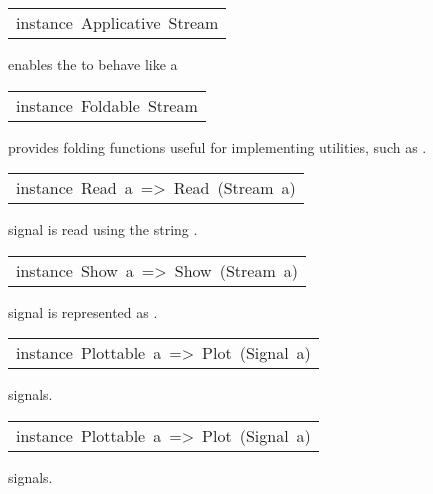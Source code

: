 \begin{haddockdesc}
\item[\begin{tabular}{@{}l}
instance\ Applicative\ Stream
\end{tabular}]\haddockbegindoc
enables the  to behave like a \par

\end{haddockdesc}
\begin{haddockdesc}
\item[\begin{tabular}{@{}l}
instance\ Foldable\ Stream
\end{tabular}]\haddockbegindoc
provides folding functions useful for implementing utilities, such as .\par

\end{haddockdesc}
\begin{haddockdesc}
\item[\begin{tabular}{@{}l}
instance\ Read\ a\ =>\ Read\ (Stream\ a)
\end{tabular}]\haddockbegindoc
signal  is read using the string .\par

\end{haddockdesc}
\begin{haddockdesc}
\item[\begin{tabular}{@{}l}
instance\ Show\ a\ =>\ Show\ (Stream\ a)
\end{tabular}]\haddockbegindoc
signal  is represented as .\par

\end{haddockdesc}
\begin{haddockdesc}
\item[\begin{tabular}{@{}l}
instance\ Plottable\ a\ =>\ Plot\ (Signal\ a)
\end{tabular}]\haddockbegindoc
{} signals.\par

\end{haddockdesc}
\begin{haddockdesc}
\item[\begin{tabular}{@{}l}
instance\ Plottable\ a\ =>\ Plot\ (Signal\ a)
\end{tabular}]\haddockbegindoc
{} signals.\par

\end{haddockdesc}
